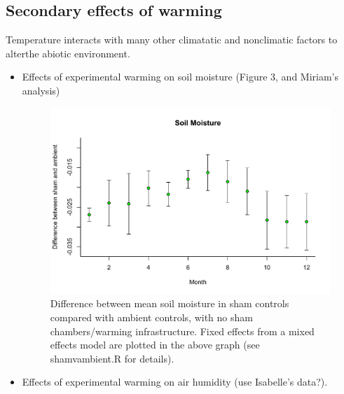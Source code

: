 \documentclass{article}
\begin{document}
\subsection {Secondary effects of warming}
\par Temperature interacts with many other climatatic and nonclimatic factors to alterthe abiotic environment. 
\begin{itemize}
\item Effects of experimental warming on soil moisture (Figure 3, and Miriam's analysis) 
\begin{figure}[p]
    \centering
\includegraphics{Analyses/figures/ShamVSAmbient_soilmois.pdf}    
\caption{Difference between mean soil moisture in sham controls compared with ambient controls, with no sham chambers/warming infrastructure. Fixed effects from a mixed effects model are plotted in the above graph (see shamvambient.R for details). }
\end{figure}

\item Effects of experimental warming on air humidity (use Isabelle's data?).
\end{itemize}
\end{document}

